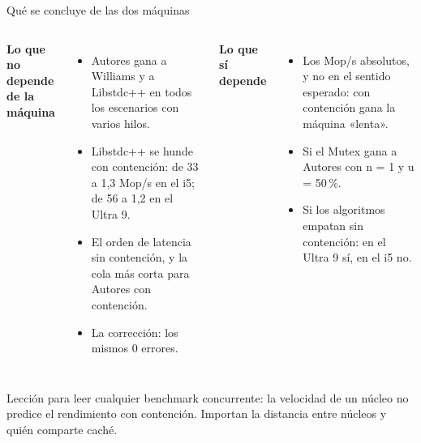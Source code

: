 \begin{frame}{Qué se concluye de las dos máquinas}
  \begin{columns}[T,onlytextwidth]
    \small\textbf{\color{bien}Lo que no depende de la máquina}\par\vspace{1mm}
    \footnotesize
    \begin{itemize}
      \item Autores gana a Williams y a Libstdc++ en todos los escenarios con varios hilos.
      \item Libstdc++ se hunde con contención: de 33 a 1,3 Mop/s en el i5; de 56 a 1,2 en el Ultra 9.
      \item El orden de latencia sin contención, y la cola más corta para Autores con contención.
      \item La corrección: los mismos 0 errores.
    \end{itemize}
    \small\textbf{\color{mal}Lo que sí depende}\par\vspace{1mm}
    \footnotesize
    \begin{itemize}
      \item Los Mop/s absolutos, y no en el sentido esperado: con contención gana la máquina «lenta».
      \item Si el Mutex gana a Autores con n = 1 y u = 50\,\%.
      \item Si los algoritmos empatan sin contención: en el Ultra 9 sí, en el i5 no.
    \end{itemize}
  \end{columns}
  \vspace{3mm}
  \begin{idea}Lección para leer cualquier benchmark concurrente: la velocidad de un núcleo no predice el rendimiento con contención. Importan la distancia entre núcleos y quién comparte caché.\end{idea}
\end{frame}
